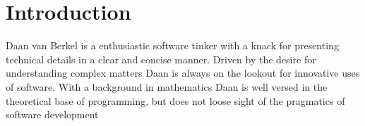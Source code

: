 \section*{Introduction}


Daan van Berkel is a enthusiastic software tinker with a knack for
presenting technical details in a clear and concise manner. Driven by the desire
for understanding complex matters Daan is always on the lookout for innovative
uses of software.
With a background in mathematics Daan is well versed in the theoretical base of
programming, but does not loose sight of the pragmatics of software development
